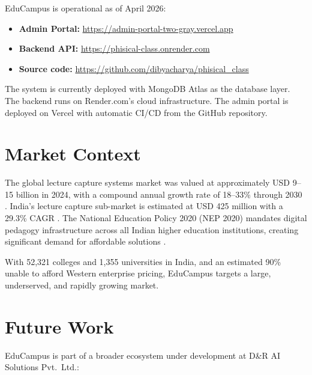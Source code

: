 \documentclass[12pt,a4paper]{article}
\begin{document}
EduCampus is operational as of April 2026:

\begin{itemize}
    \item \textbf{Admin Portal:} \url{https://admin-portal-two-gray.vercel.app}
    \item \textbf{Backend API:} \url{https://phisical-class.onrender.com}
    \item \textbf{Source code:} \url{https://github.com/dibyacharya/phisical_class}
\end{itemize}

The system is currently deployed with MongoDB Atlas as the database layer. The backend runs on Render.com's cloud infrastructure. The admin portal is deployed on Vercel with automatic CI/CD from the GitHub repository.

\section{Market Context}

The global lecture capture systems market was valued at approximately USD 9--15 billion in 2024, with a compound annual growth rate of 18--33\% through 2030 \cite{mordor2024}. India's lecture capture sub-market is estimated at USD 425 million with a 29.3\% CAGR \cite{indiaMarket}. The National Education Policy 2020 (NEP 2020) mandates digital pedagogy infrastructure across all Indian higher education institutions, creating significant demand for affordable solutions \cite{nep2020}.

With 52{,}321 colleges and 1{,}355 universities in India, and an estimated 90\% unable to afford Western enterprise pricing, EduCampus targets a large, underserved, and rapidly growing market.

\section{Future Work}

EduCampus is part of a broader ecosystem under development at D\&R AI Solutions Pvt.\ Ltd.:
\end{document}
